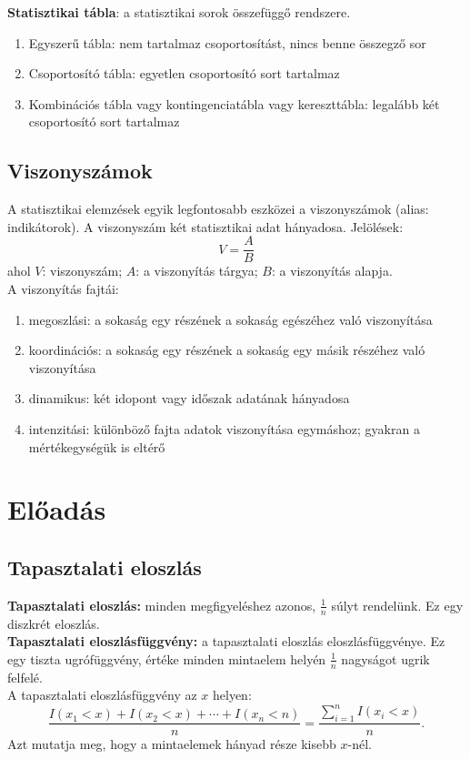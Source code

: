 \documentclass[12pt]{article}
\begin{document}
    \textbf{Statisztikai tábla}: a statisztikai sorok összefüggő rendszere.
    \begin{enumerate}
        \item Egyszerű tábla: nem tartalmaz csoportosítást, nincs benne összegző sor 
        \item Csoportosító tábla: egyetlen csoportosító sort tartalmaz
        \item Kombinációs tábla vagy kontingenciatábla vagy kereszttábla: legalább két csoportosító sort tartalmaz
    \end{enumerate}

    \subsection{Viszonyszámok}
    A statisztikai elemzések egyik legfontosabb eszközei a viszonyszámok (alias: indikátorok). A viszonyszám két statisztikai adat hányadosa. Jelölések:
    \[
        V = \frac{A}{B}
    \]
    ahol $V$: viszonyszám; $A$: a viszonyítás tárgya; $B$: a viszonyítás alapja.\\

    A viszonyítás fajtái:
    \begin{enumerate}
        \item megoszlási: a sokaság egy részének a sokaság egészéhez való viszonyítása
        \item koordinációs: a sokaság egy részének a sokaság egy másik részéhez való viszonyítása
        \item dinamikus: két idopont vagy időszak adatának hányadosa
        \item intenzitási: különböző fajta adatok viszonyítása egymáshoz; gyakran a mértékegységük is eltérő
    \end{enumerate}

    \newpage
    \section{Előadás}
    \subsection{Tapasztalati eloszlás}
    \textbf{Tapasztalati eloszlás:} minden megfigyeléshez azonos, $\frac{1}{n}$ súlyt rendelünk. Ez egy diszkrét eloszlás.\\
    \textbf{Tapasztalati eloszlásfüggvény:} a tapasztalati eloszlás eloszlásfüggvénye. Ez egy tiszta ugrófüggvény, értéke minden mintaelem helyén $\frac{1}{n}$ nagyságot ugrik felfelé.\\
    A tapasztalati eloszlásfüggvény az $x$ helyen:
    \[
        \frac{I(x_1 < x) + I(x_2 < x) + \cdots + I(x_n < n)}{n} = \frac{\sum_{i=1}^n I(x_i < x)}{n}.
    \]
    Azt mutatja meg, hogy a mintaelemek hányad része kisebb $x$-nél.
\end{document}
